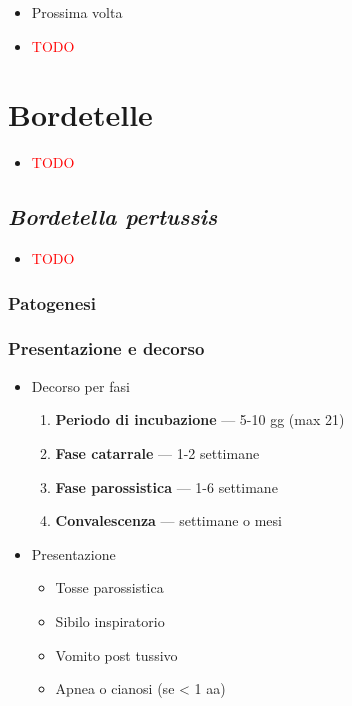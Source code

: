\documentclass[italian,]{article}
\providecommand{\tightlist}{%
  \setlength{\itemsep}{0pt}\setlength{\parskip}{0pt}}
\newcommand{\TODO}[1]{\textcolor{red}{\textsf{\footnotesize{TODO #1}}}} %
\begin{document}
\begin{itemize}
\item
  Prossima volta
\item
  \TODO{}
\end{itemize}

\hypertarget{bordetelle}{%
\section{Bordetelle}\label{bordetelle}}

\begin{itemize}
\item
  \TODO{}
\end{itemize}

\hypertarget{bordetella-pertussis}{%
\subsection{\texorpdfstring{\emph{Bordetella
pertussis}}{Bordetella pertussis}}\label{bordetella-pertussis}}

\begin{itemize}
\item
  \TODO{}
\end{itemize}

\hypertarget{patogenesi-6}{%
\subsubsection{Patogenesi}\label{patogenesi-6}}

\hypertarget{presentazione-e-decorso}{%
\subsubsection{Presentazione e decorso}\label{presentazione-e-decorso}}

\begin{itemize}
\tightlist
\item
  Decorso per fasi

  \begin{enumerate}
  \def\labelenumi{\arabic{enumi}.}
  \setcounter{enumi}{-1}
  \tightlist
  \item
    \textbf{Periodo di incubazione} --- 5-10 gg (max 21)
  \item
    \textbf{Fase catarrale} --- 1-2 settimane
  \item
    \textbf{Fase parossistica} --- 1-6 settimane
  \item
    \textbf{Convalescenza} --- settimane o mesi
  \end{enumerate}
\item
  Presentazione

  \begin{itemize}
  \tightlist
  \item
    Tosse parossistica
  \item
    Sibilo inspiratorio
  \item
    Vomito post tussivo
  \item
    Apnea o cianosi (se \textless{} 1 aa)
  \end{itemize}
\end{itemize}
\end{document}
